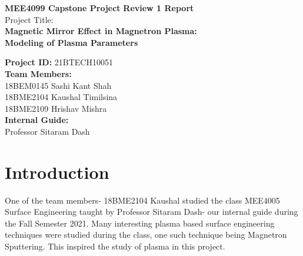 \documentclass[12pt]{article}
\begin{document}
	
	\selectfont 
		\begin{center}
			\large{\textbf{MEE4099 Capstone Project}} \hspace{1cm}\large{\textbf{Review 1 Report}} \\
			 \large{Project Title:} \\ \Large{\textbf{Magnetic Mirror Effect in Magnetron Plasma:}} \\
			\Large{\textbf{Modeling of Plasma Parameters}} \\
		\end{center}
	\textbf{Project ID:} 21BTECH10051 \\
	\textbf{Team Members:} \\
	18BEM0145 Sashi Kant Shah \\
	18BME2104 Kaushal Timilsina \\
	18BME2109 Hrishav Mishra \\
	
	\noindent \textbf{Internal Guide:} \\
	Professor Sitaram Dash
	
	\section{Introduction}
	One of the team members- 18BME2104 Kaushal studied the class MEE4005 Surface Engineering taught by Professor Sitaram Dash- our internal guide during the Fall Semester 2021. Many interesting plasma based surface engineering techniques were studied during the class, one such technique being Magnetron Sputtering. This inspired the study of plasma in this project.
	
\end{document}

